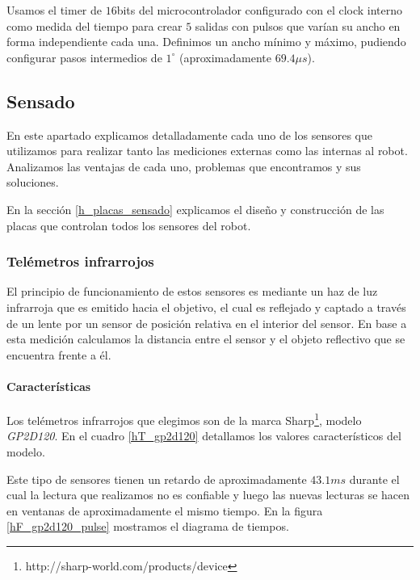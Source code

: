 Usamos el timer de $16$bits del microcontrolador configurado con el clock interno como medida del tiempo para crear $5$ salidas con
pulsos que var\'ian su ancho en forma independiente cada una.
Definimos un ancho m\'inimo y m\'aximo, pudiendo configurar pasos intermedios de $1^{\circ}$ (aproximadamente $69.4\mu s$).

\subsection{Sensado}
\label{h_sensado}

En este apartado explicamos detalladamente cada uno de los sensores que utilizamos para realizar tanto las mediciones externas como las internas al robot.
Analizamos las ventajas de cada uno, problemas que encontramos y sus soluciones.

En la secci\'on \ref{h_placas_sensado} explicamos el dise\~no y construcci\'on de las placas que controlan todos los sensores del robot.

\subsubsection{Tel\'emetros infrarrojos}
\label{h_sensado_telemetros}

El principio de funcionamiento de estos sensores es mediante un haz de luz infrarroja que es emitido hacia el objetivo, el cual
es reflejado y captado a trav\'es de un lente por un sensor de posici\'on relativa en el interior del sensor.
En base a esta medici\'on calculamos la distancia entre el sensor y el objeto reflectivo que se encuentra frente a \'el.

\paragraph{Caracter\'isticas}
\label{h_sensado_telemetros_caracteristicas}

Los tel\'emetros infrarrojos que elegimos son de la marca Sharp\footnote{http://sharp-world.com/products/device}, modelo \emph{GP2D120}.
En el cuadro \ref{hT_gp2d120} detallamos los valores caracter\'isticos del modelo.

Este tipo de sensores tienen un retardo de aproximadamente $43.1ms$ durante el cual la lectura que realizamos no es confiable y luego
las nuevas lecturas se hacen en ventanas de aproximadamente el mismo tiempo.
En la figura \ref{hF_gp2d120_pulse} mostramos el diagrama de tiempos.

